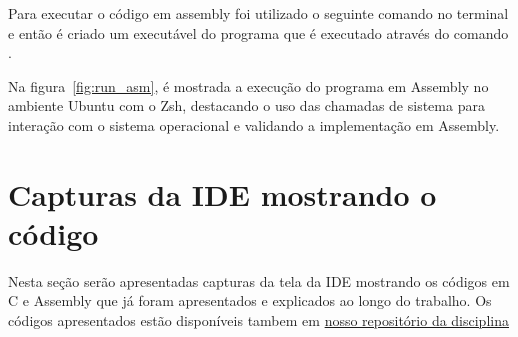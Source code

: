 \documentclass[
	12pt,				%
	openright,			%
	oneside,			%
	a4paper,			%
	chapter=TITLE,		%
	english,			%
	french,				%
	spanish,			%
	brazil				%
	]{abntex2}
\theoremstyle{definition}
\begin{document}

Para executar o código em assembly foi utilizado o seguinte comando no terminal 
e então é criado um executável do programa que é executado através do comando .
 
Na figura~\ref{fig:run_asm}, é mostrada a execução do programa em 
Assembly no ambiente Ubuntu com o Zsh, destacando o uso das chamadas de sistema para 
interação com o sistema operacional e validando a implementação em Assembly.

\section{Capturas da IDE mostrando o código}

Nesta seção serão apresentadas capturas da tela da IDE mostrando os códigos em C e 
Assembly que já foram apresentados e explicados ao longo do trabalho. Os códigos 
apresentados estão disponíveis tambem em 
\href{https://github.com/jvictorferreira3301/Sistemas_Operacionais}{nosso repositório da disciplina}
\end{document}
